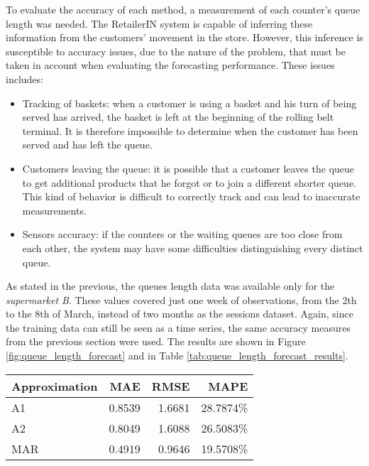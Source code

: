 To evaluate the accuracy of each method, a measurement of each counter’s queue length was needed. The RetailerIN system is capable of inferring these information from the customers’ movement in the store. However, this inference is susceptible to accuracy issues, due to the nature of the problem, that must be taken in account when evaluating the forecasting performance. These issues includes:
\begin{itemize}
  \item Tracking of baskets: when a customer is using a basket and his turn of being served has arrived, the basket is left at the beginning of the rolling belt terminal. It is therefore impossible to determine when the customer has been served and has left the queue.
  \item Customers leaving the queue: it is possible that a customer leaves the queue to get additional products that he forgot or to join a different shorter queue. This kind of behavior is difficult to correctly track and can lead to inaccurate measurements.
  \item Sensors accuracy: if the counters or the waiting queues are too close from each other, the system may have some difficulties distinguishing every distinct queue.
\end{itemize}

As stated in the previous, the queues length data was available only for the \emph{supermarket B}. These values covered just one week of observations, from the 2th to the 8th of March, instead of two months as the sessions dataset. Again, since the training data can still be seen as a time series, the same accuracy measures from the previous section were used. The results are shown in Figure \ref{fig:queue_length_forecast} and in Table \ref{tab:queue_length_forecast_results}.

\begin{center}
  \begin{tabular}{ l r r r }
    \hline
    Approximation & MAE    & RMSE   & MAPE      \\
    \hline
    A1            & 0.8539 & 1.6681 & 28.7874\% \\
    A2            & 0.8049 & 1.6088 & 26.5083\% \\
    MAR           & 0.4919 & 0.9646 & 19.5708\% \\
    \hline
  \end{tabular}
\end{center}

